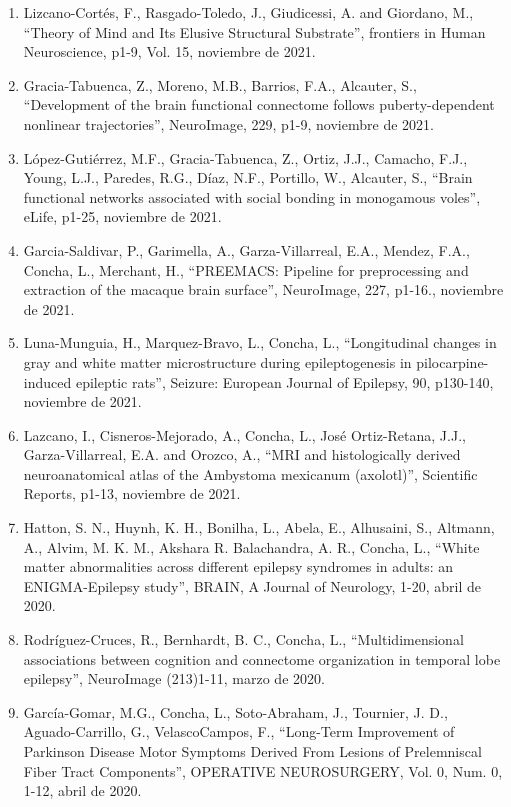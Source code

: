 \begin{enumerate}
\item Lizcano-Cortés, F., Rasgado-Toledo, J., Giudicessi, A. and Giordano, M., “Theory of Mind and Its Elusive Structural Substrate”, 
frontiers in 
Human Neuroscience, p1-9, Vol. 15, noviembre de 2021.

\item Gracia-Tabuenca, Z., Moreno, M.B., Barrios, F.A., Alcauter, S., “Development of the brain functional connectome follows 
puberty-dependent 
nonlinear trajectories”, NeuroImage, 229, p1-9, noviembre de 2021.

\item López-Gutiérrez, M.F., Gracia-Tabuenca, Z., Ortiz, J.J., Camacho, F.J., Young, L.J., Paredes, R.G., Díaz, N.F., Portillo, W., Alcauter, 
S., 
“Brain functional networks associated with social bonding in monogamous voles”, eLife, p1-25, noviembre de 2021.

\item Garcia-Saldivar, P., Garimella, A., Garza-Villarreal, E.A., Mendez, F.A., Concha, L., Merchant, H., “PREEMACS: Pipeline for 
preprocessing and 
extraction of the macaque brain surface”, NeuroImage, 227, p1-16., noviembre de 2021.

\item Luna-Munguia, H., Marquez-Bravo, L., Concha, L., “Longitudinal changes in gray and white matter microstructure during epileptogenesis 
in 
pilocarpine-induced epileptic rats”, Seizure: European Journal of Epilepsy, 90, p130-140, noviembre de 2021.

\item Lazcano, I., Cisneros-Mejorado, A., Concha, L., José Ortiz-Retana, J.J., Garza-Villarreal, E.A. and Orozco, A., “MRI and histologically 
derived neuroanatomical atlas of the Ambystoma mexicanum (axolotl)”, Scientific Reports, p1-13, noviembre de 2021.

\item Hatton, S. N., Huynh, K. H., Bonilha, L., Abela, E., Alhusaini, S., Altmann, A., Alvim, M. K. M., Akshara R. Balachandra, A. R., 
Concha, L., 
“White matter abnormalities across different epilepsy syndromes in adults: an ENIGMA-Epilepsy study”, BRAIN, A Journal of Neurology, 1-20, 
abril de 2020.

\item Rodríguez-Cruces, R., Bernhardt, B. C., Concha, L., “Multidimensional associations between cognition and connectome organization in 
temporal 
lobe epilepsy”, NeuroImage (213)1-11, marzo de 2020.

\item García-Gomar, M.G., Concha, L., Soto-Abraham, J., Tournier, J. D., Aguado-Carrillo, G., VelascoCampos, F., “Long-Term Improvement of 
Parkinson Disease Motor Symptoms Derived From Lesions of Prelemniscal Fiber Tract Components”, OPERATIVE NEUROSURGERY, Vol. 0, Num. 0, 1-12, 
abril de 2020.


\end{enumerate}
